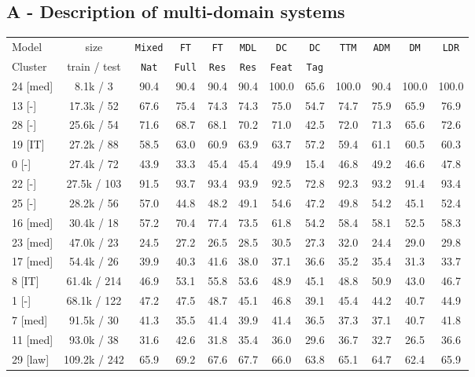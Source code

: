 \documentclass[11pt,a4paper]{article}
\newcommand{\system}[1]{\texttt{{#1}}}
\begin{document}
\subsection*{A - Description of multi-domain systems \label{ssec:implementation-details}}
\begin{table*}[t]
  \centering
  \footnotesize
  \begin{tabular}{|p{1.3cm}|*{11}{c|}} \hline
   Model  & size&\system{Mixed}&\system{FT}&\system{FT}&\system{MDL}&\system{DC}&\system{DC}&\multirow{2}{*}{\system{TTM}}&\multirow{2}{*}{\system{ADM}}&\multirow{2}{*}{\system{DM}}&\multirow{2}{*}{\system{LDR}}  \\ 
   Cluster & train / test & \system{Nat} & \system{Full} & \system{Res} &\system{Res} & \system{Feat}& \system{Tag}& & & & \\ \hline
24 \hfill [med]&8.1k / 3 &90.4&90.4&90.4&90.4&100.0&65.6&100.0&90.4&100.0&100.0 \\
13 \hfill [-]&17.3k / 52&67.6&75.4&74.3&74.3&75.0&54.7&74.7&75.9&65.9&76.9 \\
28 \hfill [-]&25.6k / 54&71.6&68.7&68.1&70.2&71.0&42.5&72.0&71.3&65.6&72.6 \\
19 \hfill [IT]&27.2k / 88&58.5&63.0&60.9&63.9&63.7&57.2&59.4&61.1&60.5&60.3 \\
0   \hfill [-]&27.4k / 72&43.9&33.3&45.4&45.4&49.9&15.4&46.8&49.2&46.6&47.8 \\
22 \hfill [-]&27.5k / 103&91.5&93.7&93.4&93.9&92.5&72.8&92.3&93.2&91.4&93.4 \\
25 \hfill [-]&28.2k / 56&57.0&44.8&48.2&49.1&54.6&47.2&49.8&54.2&45.1&52.4 \\
16 \hfill [med]&30.4k / 18&57.2&70.4&77.4&73.5&61.8&54.2&58.4&58.1&52.5&58.3 \\
23 \hfill [med]&47.0k / 23&24.5&27.2&26.5&28.5&30.5&27.3&32.0&24.4&29.0&29.8 \\
17 \hfill [med]&54.4k / 26&39.9&40.3&41.6&38.0&37.1&36.6&35.2&35.4&31.3&33.7 \\
8  \hfill [IT]&61.4k / 214&46.9&53.1&55.8&53.6&48.9&45.1&48.8&50.9&43.0&46.7 \\
1 \hfill [-]&68.1k / 122&47.2&47.5&48.7&45.1&46.8&39.1&45.4&44.2&40.7&44.9 \\
7 \hfill [med]&91.5k / 30&41.3&35.5&41.4&39.9&41.4&36.5&37.3&37.1&40.7&41.8 \\
11 \hfill [med]&93.0k / 38&31.6&42.6&31.8&35.4&36.0&29.6&36.7&32.7&26.5&36.6 \\
29 \hfill [law]&109.2k / 242&65.9&69.2&67.6&67.7&66.0&63.8&65.1&64.7&62.4&65.9 \\

\end{tabular}
\end{table*}
\end{document}
